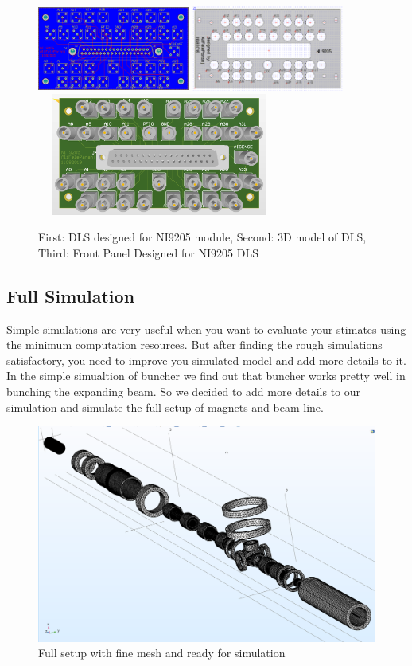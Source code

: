 \documentclass[12pt,a4paper]{article}
\begin{document}
\begin{figure}[h]
\centering
\includegraphics[width=50mm, height=28mm]{ni9205_pcb}
\includegraphics[width=50mm,
height=28mm]{ni9205panel}
\includegraphics[width=80mm,
height=40mm]{ni9205_3d}
\caption{First: DLS designed for NI9205 module, Second: 3D model of DLS, Third: Front Panel Designed for NI9205 DLS}
\label{NI}
\end{figure}


\subsection{Full Simulation}
‌Simple simulations are very useful when you want to evaluate your stimates using the minimum computation resources. But after finding the rough simulations satisfactory, you need to improve you simulated model and add more details to it. In the simple simualtion of buncher we find out that buncher works pretty well in bunching the expanding beam. So we decided to add more details to our simulation and simulate the full setup of magnets and beam line.

\begin{figure}[h]
\centering
\includegraphics[scale=0.4]{full-mesh}
\caption{Full setup with fine mesh and ready for simulation}
\end{figure}
\end{document}
